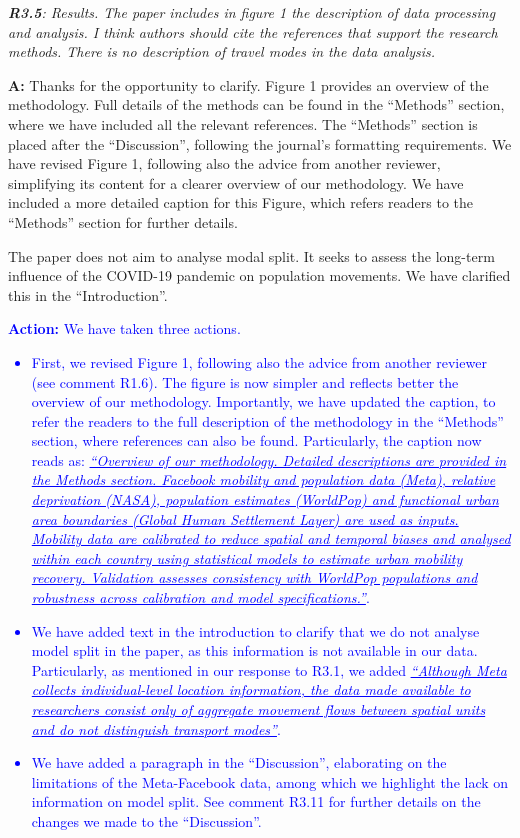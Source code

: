 \documentclass[12pt,a4paper,oneside, reqno]{amsart}
\begin{document}
\setlength{\leftskip}{0cm} \textit{\textbf{R3.5}: Results. The paper includes in figure 1 the description of data processing and analysis. I think authors should cite the references that support the research methods. There is no description of travel modes in the data analysis. }

\setlength{\leftskip}{1cm}\textbf{A:} Thanks for the opportunity to clarify. Figure 1 provides an overview of the methodology. Full details of the methods can be found in the ``Methods'' section, where we have included all the relevant references. The ``Methods'' section is placed after the ``Discussion'', following the journal's formatting requirements. We have revised Figure 1, following also the advice from another reviewer, simplifying its content for a clearer overview of our methodology. We have included a more detailed caption for this Figure, which refers readers to the ``Methods'' section for further details.

The paper does not aim to analyse modal split. It seeks to assess the long-term influence of the COVID-19 pandemic on population movements. We have clarified this in the ``Introduction''.

\textcolor{blue}{
\textbf{Action:} We have taken three actions.
\begin{itemize}[noitemsep, topsep=0pt]
    \item First, we revised Figure 1, following also the advice from another reviewer (see comment R1.6). The figure is now simpler and reflects better the overview of our methodology. Importantly, we have updated the caption, to refer the readers to the full description of the methodology in the ``Methods'' section, where references can also be found. Particularly, the caption now reads as: \textit{\ul{``Overview of our methodology. Detailed descriptions are provided in the Methods section. Facebook mobility and population data (Meta), relative deprivation (NASA), population estimates (WorldPop) and functional urban area boundaries (Global Human Settlement Layer) are used as inputs. Mobility data are calibrated to reduce spatial and temporal biases and analysed within each country using statistical models to estimate urban mobility recovery. Validation assesses consistency with WorldPop populations and robustness across calibration and model specifications.''}}.
    \item We have added text in the introduction to clarify that we do not analyse model split in the paper, as this information is not available in our data. Particularly, as mentioned in our response to R3.1, we added \textit{\uline{``Although Meta collects individual-level location information, the data made available to researchers consist only of aggregate movement flows between spatial units and do not distinguish transport modes''}}.
    \item We have added a paragraph in the ``Discussion'', elaborating on the limitations of the Meta-Facebook data, among which we highlight the lack on information on model split. See comment R3.11 for further details on the changes we made to the ``Discussion''.
\end{itemize}
}
\end{document}
